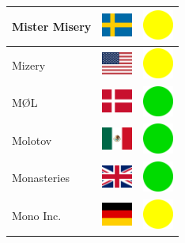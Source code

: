 \documentclass[12pt, a4paper, twoside]{report}
\begin{document}
\begin{center}
\begin{longtable}{|p{5cm}|p{2cm}|p{2cm}|}
 Mister Misery                                              & \includegraphics[width=1cm]{../img/flags/se} &   \includegraphics[width=1cm]{../likes/m} \\ \hline
 Mizery                                                     & \includegraphics[width=1cm]{../img/flags/us} &   \includegraphics[width=1cm]{../likes/m} \\ \hline
 MØL                                                        & \includegraphics[width=1cm]{../img/flags/dk} &   \includegraphics[width=1cm]{../likes/y} \\ \hline
 Molotov                                                    & \includegraphics[width=1cm]{../img/flags/mx} &   \includegraphics[width=1cm]{../likes/y} \\ \hline
 Monasteries                                                & \includegraphics[width=1cm]{../img/flags/gb} &   \includegraphics[width=1cm]{../likes/y} \\ \hline
 Mono Inc.                                                  & \includegraphics[width=1cm]{../img/flags/de} &   \includegraphics[width=1cm]{../likes/m} \\ \hline

\end{longtable}
\end{center}
\end{document}
